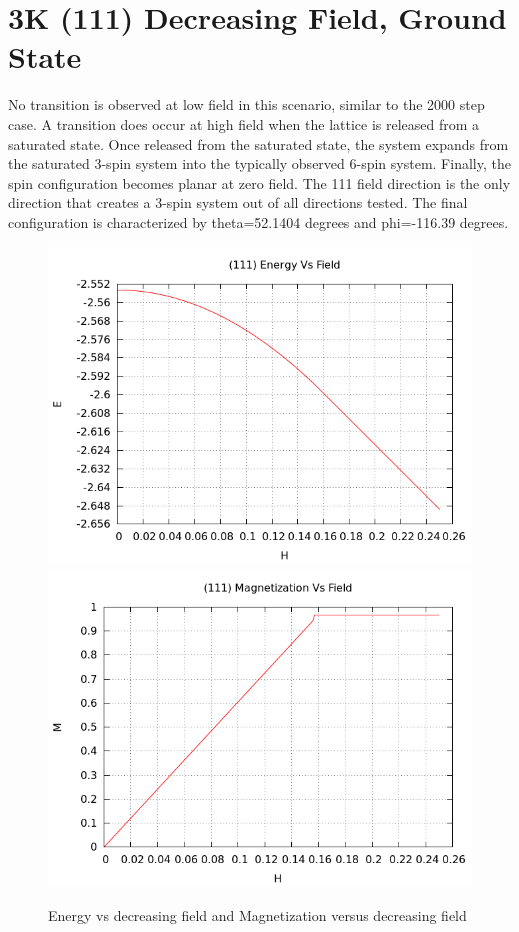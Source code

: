 \documentclass{article}
\begin{document}
\section{3K (111) Decreasing Field, Ground State}
No transition is observed at low field in this scenario, similar to the 2000 step case. A transition does occur at high
field when the lattice is released from
a saturated state. Once released from the saturated state, the system expands from the saturated 3-spin
system into the typically observed 6-spin system. Finally, the spin configuration becomes planar at zero field. 
The 111 field direction is the only direction that creates a 3-spin system out of all directions tested. The final 
configuration is characterized by theta=52.1404 degrees and phi=-116.39 degrees.
\begin{figure}[ht]
 \centering
 \includegraphics[scale=0.4]{HVariedData/Decreasing/111Edec.png}
\includegraphics[scale=0.4]{HVariedData/Decreasing/111Mdec.png}
\caption{Energy vs decreasing field and Magnetization versus decreasing field}
\end{figure}
\end{document}
